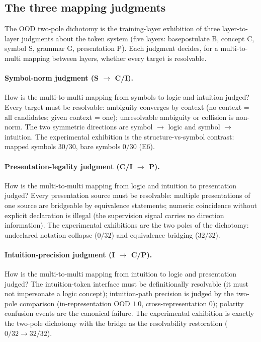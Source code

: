 \documentclass[sigplan,10pt,anonymous,review]{acmart}
\begin{document}
\subsection{The three mapping judgments}

The OOD two-pole dichotomy is the training-layer exhibition of three
layer-to-layer judgments about the token system (five layers:
basepostulate B, concept C, symbol S, grammar G, presentation P).
Each judgment decides, for a multi-to-multi mapping between layers,
whether every target is resolvable.

\paragraph{Symbol-norm judgment (S $\to$ C/I).}
How is the multi-to-multi mapping from symbols to logic and intuition
judged? Every target must be resolvable: ambiguity converges by
context (no context = all candidates; given context = one);
unresolvable ambiguity or collision is non-norm. The two symmetric
directions are symbol $\to$ logic and symbol $\to$ intuition. The
experimental exhibition is the structure-vs-symbol contrast: mapped
symbols $30/30$, bare symbols $0/30$ (E6).

\paragraph{Presentation-legality judgment (C/I $\to$ P).}
How is the multi-to-multi mapping from logic and intuition to
presentation judged? Every presentation source must be resolvable:
multiple presentations of one source are bridgeable by equivalence
statements; numeric coincidence without explicit declaration is
illegal (the supervision signal carries no direction information).
The experimental exhibitions are the two poles of the dichotomy:
undeclared notation collapse ($0/32$) and equivalence bridging
($32/32$).

\paragraph{Intuition-precision judgment (I $\to$ C/P).}
How is the multi-to-multi mapping from intuition to logic and
presentation judged? The intuition-token interface must be
definitionally resolvable (it must not impersonate a logic concept);
intuition-path precision is judged by the two-pole comparison
(in-representation OOD $1.0$, cross-representation $0$); polarity
confusion events are the canonical failure. The experimental
exhibition is exactly the two-pole dichotomy with the bridge as the
resolvability restoration ($0/32 \to 32/32$).
\end{document}
